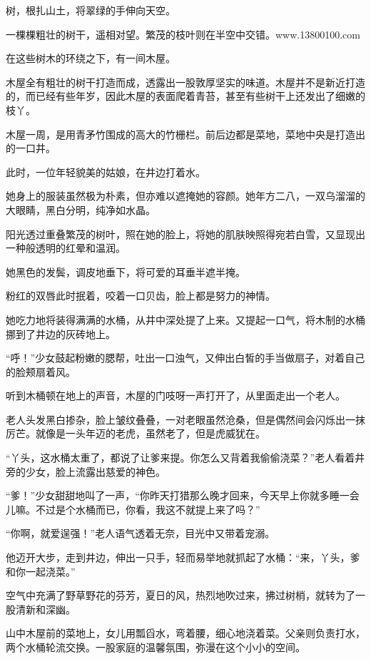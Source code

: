 
\begin{this_body}

树，根扎山土，将翠绿的手伸向天空。

一棵棵粗壮的树干，遥相对望。繁茂的枝叶则在半空中交错。www.13800100.com

在这些树木的环绕之下，有一间木屋。

木屋全有粗壮的树干打造而成，透露出一股敦厚坚实的味道。木屋并不是新近打造的，而已经有些年岁，因此木屋的表面爬着青苔，甚至有些树干上还发出了细嫩的枝丫。

木屋一周，是用青矛竹围成的高大的竹栅栏。前后边都是菜地，菜地中央是打造出的一口井。

此时，一位年轻貌美的姑娘，在井边打着水。

她身上的服装虽然极为朴素，但亦难以遮掩她的容颜。她年方二八，一双乌溜溜的大眼睛，黑白分明，纯净如水晶。

阳光透过重叠繁茂的树叶，照在她的脸上，将她的肌肤映照得宛若白雪，又显现出一种般透明的红晕和温润。

她黑色的发鬓，调皮地垂下，将可爱的耳垂半遮半掩。

粉红的双唇此时抿着，咬着一口贝齿，脸上都是努力的神情。

她吃力地将装得满满的水桶，从井中深处提了上来。又提起一口气，将木制的水桶挪到了井边的灰砖地上。

“呼！”少女鼓起粉嫩的腮帮，吐出一口浊气，又伸出白皙的手当做扇子，对着自己的脸颊扇着风。

听到木桶顿在地上的声音，木屋的门吱呀一声打开了，从里面走出一个老人。

老人头发黑白掺杂，脸上皱纹叠叠，一对老眼虽然沧桑，但是偶然间会闪烁出一抹厉芒。就像是一头年迈的老虎，虽然老了，但是虎威犹在。

“丫头，这水桶太重了，都说了让爹来提。你怎么又背着我偷偷浇菜？”老人看着井旁的少女，脸上流露出慈爱的神色。

“爹！”少女甜甜地叫了一声，“你昨天打猎那么晚才回来，今天早上你就多睡一会儿嘛。不过是个水桶而已，你看，我这不就提上来了吗？”

“你啊，就爱逞强！”老人语气透着无奈，目光中又带着宠溺。

他迈开大步，走到井边，伸出一只手，轻而易举地就抓起了水桶：“来，丫头，爹和你一起浇菜。”

空气中充满了野草野花的芬芳，夏日的风，热烈地吹过来，拂过树梢，就转为了一股清新和深幽。

山中木屋前的菜地上，女儿用瓢舀水，弯着腰，细心地浇着菜。父亲则负责打水，两个水桶轮流交换。一股家庭的温馨氛围，弥漫在这个小小的空间。


\end{this_body}
